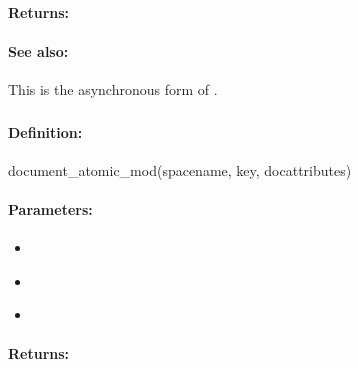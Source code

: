 \paragraph{Returns:}


\paragraph{See also:}  This is the asynchronous form of .

\pagebreak
\subsubsection{}
\label{api:ruby:document_atomic_mod}


\paragraph{Definition:}
\begin{rubycode}
document_atomic_mod(spacename, key, docattributes)
\end{rubycode}

\paragraph{Parameters:}
\begin{itemize}[noitemsep]
\item {}\\

\item {}\\

\item {}\\

\end{itemize}

\paragraph{Returns:}


\pagebreak
\subsubsection{}
\label{api:ruby:async_document_atomic_mod}


